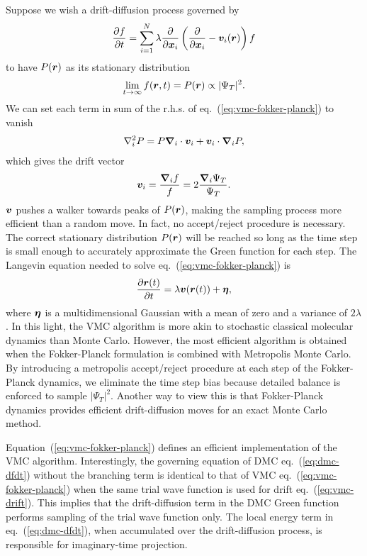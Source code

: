 Suppose we wish a drift-diffusion process governed by
\begin{align} \label{eq:vmc-fokker-planck}
\dfrac{\partial f}{\partial t} = \sum\limits_{i=1}^N \lambda\dfrac{\partial}{\partial\boldsymbol{x}_i}\left(
\dfrac{\partial}{\partial\boldsymbol{x}_i} -\boldsymbol{v}_i(\boldsymbol{r})
\right)f
\end{align}
to have $P(\boldsymbol{r})$ as its stationary distribution
\begin{align}
\lim\limits_{t\rightarrow\infty} f(\boldsymbol{r},t) = P(\boldsymbol{r}) \propto \vert\Psi_T\vert^2.
\end{align}
We can set each term in sum of the r.h.s. of eq.~(\ref{eq:vmc-fokker-planck}) to vanish
\begin{align}
\nabla_i^2 P = P\boldsymbol{\nabla}_i\cdot\boldsymbol{v}_i + \boldsymbol{v}_i\cdot\boldsymbol{\nabla}_iP,
\end{align}
which gives the drift vector
\begin{align} \label{eq:vmc-drift}
\boldsymbol{v}_i = \dfrac{\boldsymbol{\nabla}_if}{f} = 2\dfrac{\boldsymbol{\nabla}_i\Psi_T}{\Psi_T}.
\end{align}
$\boldsymbol{v}$ pushes a walker towards peaks of $P(\boldsymbol{r})$, making the sampling process more efficient than a random move.
In fact, no accept/reject procedure is necessary.
The correct stationary distribution $P(\boldsymbol{r})$ will be reached so long as the time step is small enough to accurately approximate the Green function for each step.
The Langevin equation needed to solve eq.~(\ref{eq:vmc-fokker-planck}) is
\begin{align}
\dfrac{\partial\boldsymbol{r}(t)}{\partial t} = \lambda \boldsymbol{v}(\boldsymbol{r}(t)) + \boldsymbol{\eta},
\end{align}
where $\boldsymbol{\eta}$ is a multidimensional Gaussian with a mean of zero and a variance of $2\lambda$. In this light, the VMC algorithm is more akin to stochastic classical molecular dynamics than Monte Carlo. However, the most efficient algorithm is obtained when the Fokker-Planck formulation is combined with Metropolis Monte Carlo. By introducing a metropolis accept/reject procedure at each step of the Fokker-Planck dynamics, we eliminate the time step bias because detailed balance is enforced to sample $\vert\Psi_T\vert^2$. Another way to view this is that Fokker-Planck dynamics provides efficient drift-diffusion moves for an exact Monte Carlo method.

Equation~(\ref{eq:vmc-fokker-planck}) defines an efficient implementation of the VMC algorithm. Interestingly, the governing equation of DMC eq.~(\ref{eq:dmc-dfdt}) without the branching term is identical to that of VMC eq.~(\ref{eq:vmc-fokker-planck}) when the same trial wave function is used for drift eq.~(\ref{eq:vmc-drift}).
This implies that the drift-diffusion term in the DMC Green function performs sampling of the trial wave function only. The local energy term in eq.~(\ref{eq:dmc-dfdt}), when accumulated over the drift-diffusion process, is responsible for imaginary-time projection.


